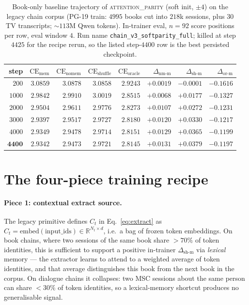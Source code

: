 \documentclass{article}
\newcommand{\dnm}{\Delta_{\text{nm-m}}}
\newcommand{\dsh}{\Delta_{\text{sh-m}}}
\newcommand{\dor}{\Delta_{\text{or-m}}}
\newcommand{\CEmem}{\mathrm{CE}_{\text{mem}}}
\newcommand{\CEnomem}{\mathrm{CE}_{\text{nomem}}}
\newcommand{\CEsh}{\mathrm{CE}_{\text{shuffle}}}
\newcommand{\CEor}{\mathrm{CE}_{\text{oracle}}}
\begin{document}
\begin{table}[t]
\centering
\caption{Book-only baseline trajectory of \textsc{attention\_parity}
(soft init, $\pm 4$) on the legacy chain corpus
(PG-19 train: $4995$ books cut into $218$k sessions, plus $30$ TV
transcripts; $\sim 113$M Qwen tokens). In-trainer eval, $n{=}92$
score positions per row, eval window $4$. Run name
\texttt{chain\_v3\_softparity\_full}; killed at step $4425$ for the
recipe rerun, so the listed step-$4400$ row is the best persisted
checkpoint.}
\label{tab:v3_baseline}
\small
\begin{tabular}{rrrrrrrr}
\toprule
step & $\CEmem$ & $\CEnomem$ & $\CEsh$ & $\CEor$ & $\dnm$ & $\dsh$ & $\dor$ \\
\midrule
$200$  & $3.0859$ & $3.0878$ & $3.0858$ & $2.9243$ & $+0.0019$ & $-0.0001$ & $-0.1616$ \\
$1000$ & $2.9842$ & $2.9910$ & $3.0019$ & $2.8515$ & $+0.0068$ & $+0.0177$ & $-0.1327$ \\
$2000$ & $2.9504$ & $2.9611$ & $2.9776$ & $2.8273$ & $+0.0107$ & $+0.0272$ & $-0.1231$ \\
$3000$ & $2.9397$ & $2.9517$ & $2.9727$ & $2.8180$ & $+0.0120$ & $+0.0330$ & $-0.1217$ \\
$4000$ & $2.9349$ & $2.9478$ & $2.9714$ & $2.8151$ & $+0.0129$ & $+0.0365$ & $-0.1199$ \\
$\mathbf{4400}$ & $\mathbf{2.9342}$ & $\mathbf{2.9473}$ & $\mathbf{2.9721}$ & $\mathbf{2.8145}$ & $\mathbf{+0.0131}$ & $\mathbf{+0.0379}$ & $\mathbf{-0.1197}$ \\
\bottomrule
\end{tabular}
\end{table}


\section{The four-piece training recipe}
\label{sec:recipe}

\paragraph{Piece 1: contextual extract source.}
The legacy primitive defines $C_t$ in Eq.~\ref{eq:extract} as
$C_t = \mathrm{embed}(\text{input\_ids}) \in \mathbb{R}^{N_t \times d}$,
i.e.\ a bag of frozen token embeddings. On book chains, where two
sessions of the same book share $>\!70\%$ of token identities, this
is sufficient to support a positive in-trainer $\dsh$ via
\emph{lexical} memory --- the extractor learns to attend to a
weighted average of token identities, and that average distinguishes
this book from the next book in the corpus. On dialogue chains it
collapses: two MSC sessions about the same person can share $<\!30\%$
of token identities, so a lexical-memory shortcut produces no
generalisable signal.
\end{document}
